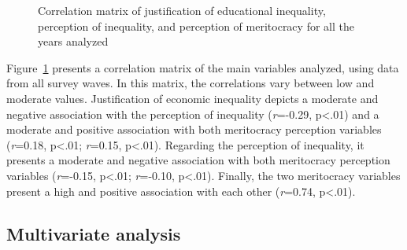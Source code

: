 \documentclass[
]{article}
\begin{document}
\begin{figure}[H]


\caption{\label{fig-correlation}Correlation matrix of justification of
educational inequality, perception of inequality, and perception of
meritocracy for all the years analyzed}

\end{figure}%

Figure~\ref{fig-correlation} presents a correlation matrix of the main
variables analyzed, using data from all survey waves. In this matrix,
the correlations vary between low and moderate values. Justification of
economic inequality depicts a moderate and negative association with the
perception of inequality (\emph{r}=-0.29, p\textless.01) and a moderate
and positive association with both meritocracy perception variables
(\emph{r}=0.18, p\textless.01; \emph{r}=0.15, p\textless.01). Regarding
the perception of inequality, it presents a moderate and negative
association with both meritocracy perception variables (\emph{r}=-0.15,
p\textless.01; \emph{r}=-0.10, p\textless.01). Finally, the two
meritocracy variables present a high and positive association with each
other (\emph{r}=0.74, p\textless.01).

\subsection{Multivariate analysis}\label{multivariate-analysis}
\end{document}
